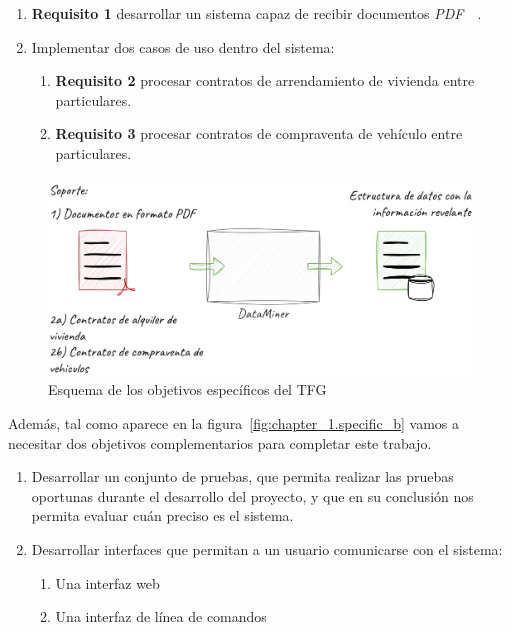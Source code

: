 \begin{enumerate}
    \item
    \textbf{Requisito 1} desarrollar un sistema capaz de recibir documentos
    \textit{PDF}~\cite{url_adobe_pdf}~\label{req:transform_pdf_to_text}.

    \item
    Implementar dos casos de uso dentro del sistema:
    \begin{enumerate}
        \item
        \textbf{Requisito 2} procesar contratos de arrendamiento de vivienda entre
        particulares\label{req:residence_lease_agreement}.

        \item
        \textbf{Requisito 3} procesar contratos de compraventa de vehículo entre
        particulares\label{req:sale_and_purchase_agreement}.
    \end{enumerate}
\end{enumerate}

\begin{figure}[ht]
    \begin{center}
        \includegraphics[width=\textwidth]{chapter/1/images/chapter_1.specific_a}
        \caption{Esquema de los objetivos específicos del TFG}
        \label{fig:chapter_1.specific_a}
    \end{center}
\end{figure}

Además, tal como aparece en la figura~\ref{fig:chapter_1.specific_b} vamos a necesitar dos objetivos complementarios
para completar este trabajo.

\begin{enumerate}
    \item Desarrollar un conjunto de pruebas, que permita realizar las pruebas oportunas durante el desarrollo del
    proyecto, y que en su conclusión nos permita evaluar cuán preciso es el sistema.

    \item Desarrollar interfaces que permitan a un usuario comunicarse con el sistema:
    \begin{enumerate}
        \item  Una interfaz web
        \item  Una interfaz de línea de comandos
    \end{enumerate}
\end{enumerate}

